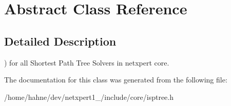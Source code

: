 \hypertarget{classAbstract}{}\section{Abstract Class Reference}
\label{classAbstract}


\subsection{Detailed Description}
) for all Shortest Path Tree Solvers in netxpert core. 

The documentation for this class was generated from the following file\+:\begin{DoxyCompactItemize}
\item 
/home/hahne/dev/netxpert1\+\_/include/core/isptree.\+h\end{DoxyCompactItemize}
